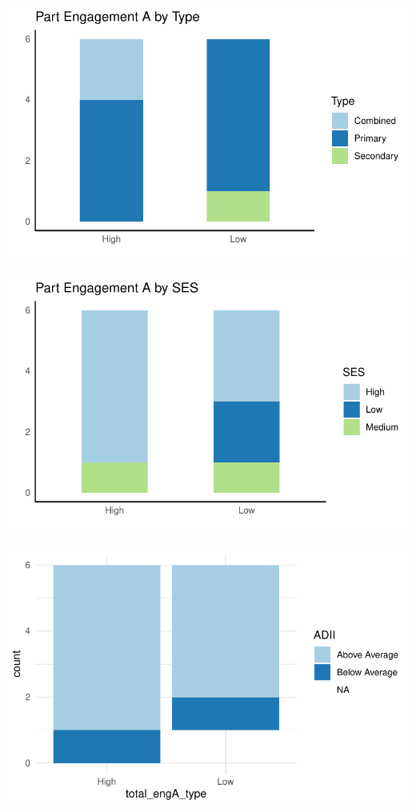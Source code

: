\documentclass[
  letterpaper,
  DIV=11,
  numbers=noendperiod]{scrartcl}
\begin{document}
\includegraphics{report_files/figure-pdf/unnamed-chunk-19-3.pdf}

\includegraphics{report_files/figure-pdf/unnamed-chunk-19-4.pdf}

\includegraphics{report_files/figure-pdf/unnamed-chunk-19-5.pdf}
\end{document}
